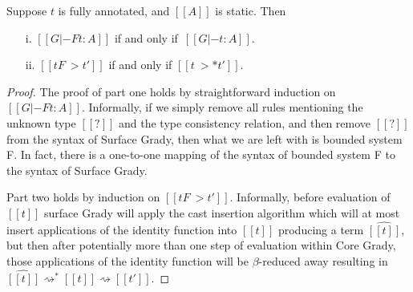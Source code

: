 \begin{lemma}
  \label{lemma:F-inclusion}
  Suppose $t$ is fully annotated, and $[[A]]$ is static.  Then
  \begin{itemize}
  \item[]
  \item[i.] $[[G |-F t : A]]$ if and only if $\,[[G |- t : A]]$.
  \item[ii.] $[[t F~> t']]$ if and only if $[[t ~>* t']]$.
  \end{itemize}
\end{lemma}
\begin{proof}
  The proof of part one holds by straightforward induction on $[[G |-F
      t : A]]$.  Informally, if we simply remove all rules mentioning
  the unknown type $[[?]]$ and the type consistency relation, and then
  remove $[[?]]$ from the syntax of Surface Grady, then what we are
  left with is bounded system F.  In fact, there is a one-to-one
  mapping of the syntax of bounded system F to the syntax of Surface
  Grady.

  Part two holds by induction on $[[t F~> t']]$.  Informally, before
  evaluation of $[[t]]$ surface Grady will apply the cast insertion
  algorithm which will at most insert applications of the identity
  function into $[[t]]$ producing a term $\widehat{[[t]]}$, but then
  after potentially more than one step of evaluation within Core
  Grady, those applications of the identity function will be
  $\beta$-reduced away resulting in $\widehat{[[t]]}
  \rightsquigarrow^* [[t]] \rightsquigarrow [[t']]$.
\end{proof}
